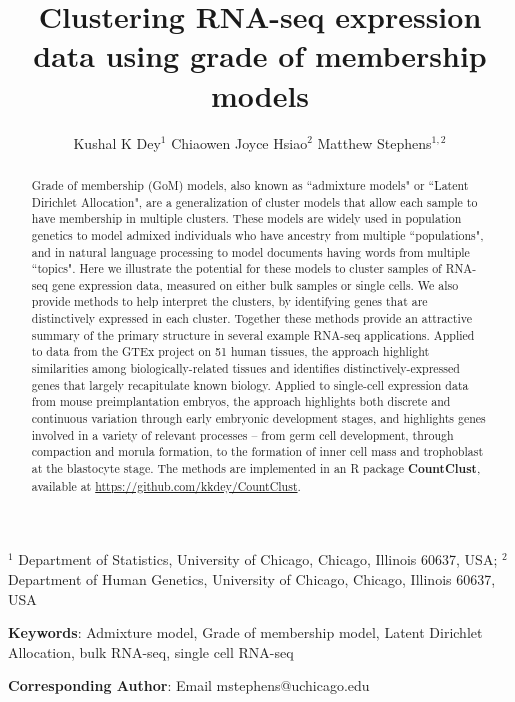 \title{\Large{\textbf{Clustering RNA-seq expression data using grade of membership models}}}
\author{ Kushal K Dey$^{1}$  \qquad Chiaowen Joyce Hsiao$^{2}$ \qquad Matthew Stephens$^{1,2}$}

\maketitle

$^{1}$ Department of Statistics, University of Chicago, Chicago, Illinois 60637, USA;  $^{2}$ Department of Human Genetics, University of Chicago, Chicago, Illinois 60637, USA

\textbf{Keywords}: Admixture model, Grade of membership model, Latent Dirichlet Allocation, bulk RNA-seq, single cell RNA-seq

\textbf{Corresponding Author}: Email mstephens@uchicago.edu
					      


\newpage

\begin{abstract}
Grade of membership (GoM) models, also known as ``admixture models" or ``Latent Dirichlet Allocation",
are a generalization of cluster models that allow each sample to have membership in multiple clusters.
These models are widely used in population genetics to model admixed individuals who have ancestry from multiple ``populations", 
and in natural language processing to model documents having words from multiple ``topics". Here we illustrate the potential for these models
to cluster samples of RNA-seq gene expression data, measured on either bulk samples or single cells. 
We also provide methods to help interpret the clusters, by identifying genes that are distinctively expressed in each cluster. 
Together these methods provide an attractive summary of the primary structure in several example RNA-seq applications. Applied to
data from the GTEx project on 51 human tissues, the approach highlight similarities among biologically-related tissues and
identifies distinctively-expressed genes that largely recapitulate known biology.  Applied to single-cell expression data from 
mouse preimplantation embryos, the approach highlights both discrete and continuous variation through early embryonic development stages,
and highlights genes involved in a variety of relevant processes -- from germ cell development, through compaction and morula formation, to
the formation of inner cell mass and trophoblast at the blastocyte stage.
The methods are implemented in an R package \textbf{CountClust}, available at \url{https://github.com/kkdey/CountClust}.
\end{abstract}

